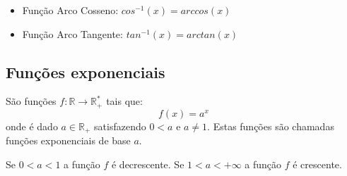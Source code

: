 \begin{itemize}
  \item Função Arco Cosseno: $cos^{-1}(x)= arccos (x)$


  \item Função Arco Tangente: $tan^{-1}(x)= arctan (x)$


  \end{itemize}

 \subsection{Funções exponenciais}

 São funções $f: \mathbb{R} \rightarrow \mathbb{R_{+}^{*}} $ tais que:
 \[f(x) = a^x\]
 onde é dado $a \in \mathbb{R_{+}}$ satisfazendo $0 < a$ e $a \neq 1$. Estas funções são chamadas funções exponenciais de base $a$.

 Se $0 < a < 1$ a função $f$ é decrescente. Se $1 < a < +\infty$ a função $f$ é crescente.

